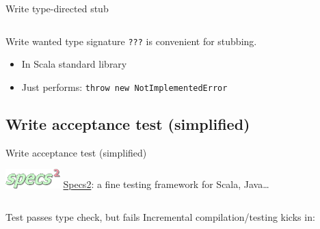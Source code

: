 \begin{frame}[fragile]{Write type-directed stub}
  \inputminted{scala}{Main2.scala}

  \begin{block}{Write wanted type signature}
    \texttt{???} is convenient for stubbing.
    \begin{itemize}
    \item In Scala standard library
    \item Just performs: \texttt{throw new NotImplementedError}
    \end{itemize}
  \end{block}
\end{frame}

\subsection{Write acceptance test (simplified)}

\begin{frame}[fragile]{Write acceptance test (simplified)}
  \begin{block}{\includegraphics[height=0.75cm]{specs2.png}}
    \href{http://specs2.org/}{Specs2}: a fine testing framework for Scala, Java\dots
  \end{block}

  \inputminted{scala}{MainSpec1.scala}

\end{frame}

\begin{frame}[fragile]{Test passes type check, but fails}
  Incremental compilation/testing kicks in:

  \inputminted{console}{testQuick2.console}
\end{frame}


